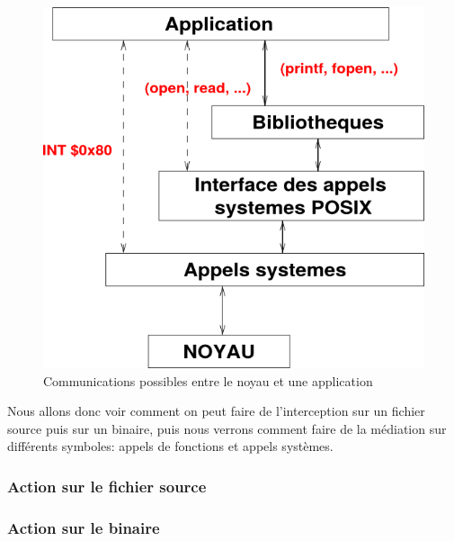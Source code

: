 \begin{figure}[H]
 \centering
 \includegraphics[scale=0.5]{Pictures/Communication_application_noyau.png}
 \caption{Communications possibles entre le noyau et une application}
 \label{AS_Communication}
\end{figure}

Nous allons donc voir comment on peut faire de l'interception sur un fichier
source puis sur un binaire, puis nous verrons comment faire de la médiation sur
différents symboles: appels de fonctions et appels systèmes.

\subsubsection{Action sur le fichier source}
\subsubsection{Action sur le binaire}
  

